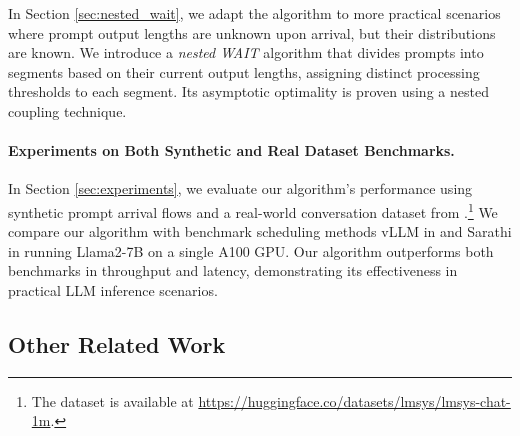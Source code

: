 In Section \ref{sec:nested_wait}, we adapt the algorithm to more practical scenarios where prompt output lengths are unknown upon arrival, but their distributions are known. We introduce a \textit{nested WAIT} algorithm that divides prompts into segments based on their current output lengths, assigning distinct processing thresholds to each segment. Its asymptotic optimality is proven using a nested coupling technique.

\paragraph*{Experiments on Both Synthetic and Real Dataset Benchmarks.} In Section \ref{sec:experiments}, we evaluate our algorithm’s performance using synthetic prompt arrival flows and a real-world conversation dataset from \cite{zheng2023lmsys}.\footnote{The dataset is available at \url{https://huggingface.co/datasets/lmsys/lmsys-chat-1m}.} We compare our algorithm with benchmark scheduling methods vLLM in \cite{kwon2023efficient} and Sarathi in \cite{agrawal2023sarathi} running Llama2-7B on a single A100 GPU. Our algorithm outperforms both benchmarks in throughput and latency, demonstrating its effectiveness in practical LLM inference scenarios.


\subsection{Other Related Work}
